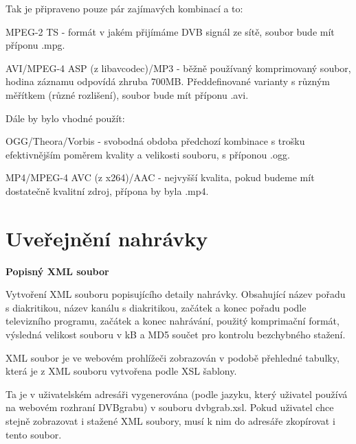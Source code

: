 \vspace{10pt}

Tak je připraveno pouze pár zajímavých kombinací a to:

\vspace{10pt}

MPEG-2 TS - formát v jakém přijímáme DVB signál ze sítě, soubor bude mít příponu .mpg.

AVI/MPEG-4 ASP (z libavcodec)/MP3 - běžně používaný komprimovaný soubor, hodina záznamu odpovídá zhruba 700MB. Předdefinované varianty s různým měřítkem (různé rozlišení), soubor bude mít příponu .avi.

\vspace{10pt}

Dále by bylo vhodné použít:

\vspace{10pt}

OGG/Theora/Vorbis - svobodná obdoba předchozí kombinace s trošku efektivnějším poměrem kvality a velikosti souboru, s příponou .ogg.

MP4/MPEG-4 AVC (z x264)/AAC - nejvyšší kvalita, pokud budeme mít dostatečně kvalitní zdroj, přípona by byla .mp4.

\vspace{10pt}

\section{Uveřejnění nahrávky}

\vspace{10pt}

\textbf{Popisný XML soubor}

Vytvoření XML souboru popisujícího detaily nahrávky. Obsahující název pořadu s diakritikou, název kanálu s diakritikou, začátek a konec pořadu podle televizního programu, začátek a konec nahrávání, použitý komprimační formát, výsledná velikost souboru v kB a MD5 součet pro kontrolu bezchybného stažení.

XML soubor je ve webovém prohlížeči zobrazován v podobě přehledné tabulky, která je z XML souboru vytvořena podle XSL šablony.

Ta je v uživatelském adresáři vygenerována (podle jazyku, který uživatel používá na webovém rozhraní DVBgrabu) v souboru dvbgrab.xsl. Pokud uživatel chce stejně zobrazovat i stažené XML soubory, musí k nim do adresáře zkopírovat i tento soubor.

\vspace{10pt}

